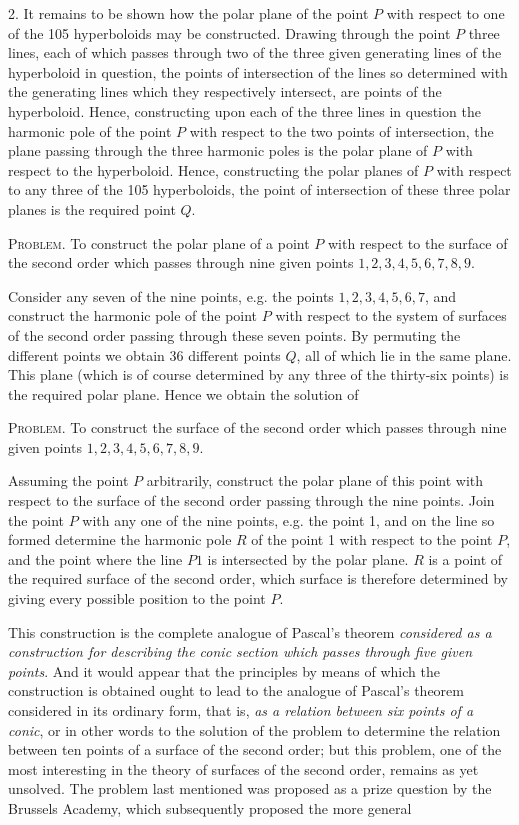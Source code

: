 \documentclass[10pt]{article}
\newcommand{\qedpage}{\vfill\pagebreak}
\begin{document}
2. It remains to be shown how the polar plane of the point $P$ with respect to one
of the 105 hyperboloids may be constructed. Drawing through the point $P$ three
lines, each of which passes through two of the three given generating lines of the
hyperboloid in question, the points of intersection of the lines so determined with
the generating lines which they respectively intersect, are points of the hyperboloid.
Hence, constructing upon each of the three lines in question the harmonic pole of the
point $P$ with respect to the two points of intersection, the plane passing through the
three harmonic poles is the polar plane of $P$ with respect to the hyperboloid. Hence,
constructing the polar planes of $P$ with respect to any three of the 105
hyperboloids, the point of intersection of these three polar planes is the required
point $Q$.

\textsc{Problem.} To construct the polar plane of a point $P$ with respect to the
surface of the second order which passes through nine given points
$1,2,3,4,5,6,7,8,9$.

Consider any seven of the nine points, e.g. the points $1,2,3,4,5,6,7$, and construct
the harmonic pole of the point $P$ with respect to the system of surfaces of the
second order passing through these seven points. By permuting the different points
we obtain 36 different points $Q$, all of which lie in the same plane. This plane
(which is of course determined by any three of the thirty-six points) is the required
polar plane. Hence we obtain the solution of

\textsc{Problem.} To construct the surface of the second order which passes through
nine given points $1,2,3,4,5,6,7,8,9$.

Assuming the point $P$ arbitrarily, construct the polar plane of this point with
respect to the surface of the second order passing through the nine points. Join the
point $P$ with any one of the nine points, e.g. the point 1, and on the line so formed
determine the harmonic pole $R$ of the point 1 with respect to the point $P$, and the
point where the line $P1$ is intersected by the polar plane. $R$ is a point of the
required surface of the second order, which surface is therefore determined by giving
every possible position to the point $P$.

This construction is the complete analogue of Pascal's theorem \textit{considered as a
construction for describing the conic section which passes through five given points}.
And it would appear that the principles by means of which the construction is
obtained ought to lead to the analogue of Pascal's theorem considered in its ordinary
form, that is, \textit{as a relation between six points of a conic}, or in other words to
the solution of the problem to determine the relation between ten points of a surface
of the second order; but this problem, one of the most interesting in the theory of
surfaces of the second order, remains as yet unsolved. The problem last mentioned was
proposed as a prize question by the Brussels Academy, which subsequently proposed the
more general
\qedpage
\end{document}
